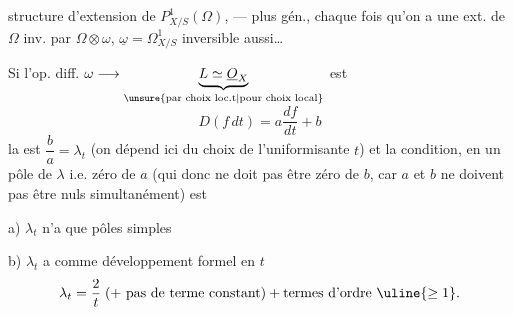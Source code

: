 structure d'extension de $P^1_{X/S}(\Omega)$, --- plus gén., chaque fois qu'on a une ext. de $\Omega$ inv. par $\Omega\otimes\omega$, $\underline{\omega}=\Omega^1_{X/S}$ inversible aussi\ldots

Si l'op. diff. $\omega\longrightarrow\underbrace{L\simeq\underline{O}_X}_{\unsure{\text{par choix loc.t}|\text{pour choix local}}}$ est
\[
D(f\,dt)=a\frac{df}{dt}+b
\]
la  est $\dfrac ba=\lambda_t$
(on dépend ici du choix de l'uniformisante $t$)
et la condition, en un pôle de $\lambda$ i.e. zéro de $a$
(qui donc ne doit pas être zéro de $b$, car $a$ et $b$ ne doivent pas être nuls simultanément) est

\noindent a) $\lambda_t$  n'a que pôles simples

\noindent b) \deleted{$\unsure{\beta}$} $\lambda_t$ a comme développement formel en $t$
\[
\lambda_t=\frac{2}{t}\;(+\text{ pas de terme constant})+\text{termes d'ordre }\uline{\geq1}.
\]
